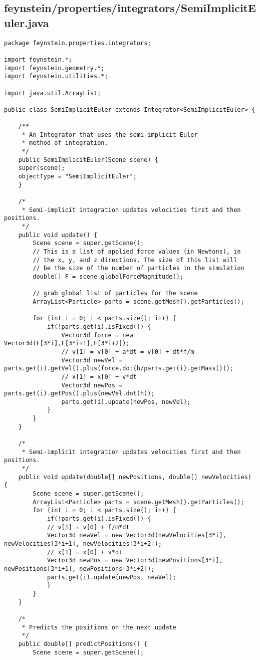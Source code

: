 \subsection*{feynstein/properties/integrators/SemiImplicitEuler.java}
\begin{lstlisting}
package feynstein.properties.integrators;

import feynstein.*;
import feynstein.geometry.*;
import feynstein.utilities.*;

import java.util.ArrayList;

public class SemiImplicitEuler extends Integrator<SemiImplicitEuler> {

	/**
	 * An Integrator that uses the semi-implicit Euler
	 * method of integration.
	 */
    public SemiImplicitEuler(Scene scene) {
	super(scene);
	objectType = "SemiImplicitEuler";
    }
	
	/*
	 * Semi-implicit integration updates velocities first and then positions.
	 */
	public void update() {
		Scene scene = super.getScene();
		// This is a list of applied force values (in Newtons), in 
		// the x, y, and z directions. The size of this list will
		// be the size of the number of particles in the simulation
		double[] F = scene.globalForceMagnitude();
	
		// grab global list of particles for the scene
		ArrayList<Particle> parts = scene.getMesh().getParticles();
	
		for (int i = 0; i < parts.size(); i++) {
			if(!parts.get(i).isFixed()) {
				Vector3d force = new Vector3d(F[3*i],F[3*i+1],F[3*i+2]);
				// v[1] = v[0] + a*dt = v[0] + dt*f/m
				Vector3d newVel = parts.get(i).getVel().plus(force.dot(h/parts.get(i).getMass()));
				// x[1] = x[0] + v*dt
				Vector3d newPos = parts.get(i).getPos().plus(newVel.dot(h));
				parts.get(i).update(newPos, newVel);
			}
		}
    }

	/*
	 * Semi-implicit integration updates velocities first and then positions.
	 */
    public void update(double[] newPositions, double[] newVelocities) {
		Scene scene = super.getScene();
		ArrayList<Particle> parts = scene.getMesh().getParticles();
		for (int i = 0; i < parts.size(); i++) {
			if(!parts.get(i).isFixed()) {
			// v[1] = v[0] + f/m*dt
			Vector3d newVel = new Vector3d(newVelocities[3*i], newVelocities[3*i+1], newVelocities[3*i+2]);
			// x[1] = x[0] + v*dt
			Vector3d newPos = new Vector3d(newPositions[3*i], newPositions[3*i+1], newPositions[3*i+2]);
			parts.get(i).update(newPos, newVel);
			}
		}
    }

	/*
	 * Predicts the positions on the next update
	 */
    public double[] predictPositions() {
		Scene scene = super.getScene();
		

\end{lstlisting}
